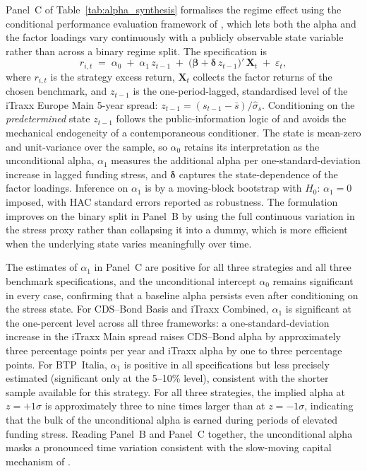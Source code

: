 Panel~C of Table~\ref{tab:alpha_synthesis} formalises the regime effect
using the conditional performance evaluation framework of
\citet{christopherson1998conditioning}, which lets both the alpha and the
factor loadings vary continuously with a publicly observable state variable
rather than across a binary regime split. The specification is
\begin{equation}\label{eq:cfg}
  r_{i,t} \;=\; \alpha_0 \;+\; \alpha_1\, z_{t-1}
  \;+\; \bigl(\boldsymbol{\beta} + \boldsymbol{\delta}\, z_{t-1}\bigr)'\,
  \mathbf{X}_{t} \;+\; \varepsilon_{t},
\end{equation}
where $r_{i,t}$ is the strategy excess return, $\mathbf{X}_t$ collects the factor
returns of the chosen benchmark, and $z_{t-1}$ is the one-period-lagged,
standardised level of the iTraxx Europe Main 5-year spread:
$z_{t-1} = (s_{t-1} - \bar{s})/\hat{\sigma}_s$. Conditioning on the
\emph{predetermined} state $z_{t-1}$ follows the public-information logic of
\citet{christopherson1998conditioning} and avoids the mechanical endogeneity of
a contemporaneous conditioner. The state is mean-zero and unit-variance over the
sample, so $\alpha_0$ retains its interpretation as the unconditional alpha,
$\alpha_1$ measures the additional alpha per one-standard-deviation increase in
lagged funding stress, and $\boldsymbol{\delta}$ captures the state-dependence of
the factor loadings. Inference on $\alpha_1$ is by a moving-block bootstrap with
$H_0{:}\,\alpha_1=0$ imposed, with \citet{newey1994automatic} HAC standard errors
reported as robustness. 
The \citet{christopherson1998conditioning} formulation improves on the binary
split in Panel~B by using the full continuous variation in the stress
proxy rather than collapsing it into a dummy, which is more efficient
when the underlying state varies meaningfully over time.

The estimates of $\alpha_1$ in Panel~C are positive for all three
strategies and all three benchmark specifications, and the
unconditional intercept $\alpha_0$ remains significant in every case,
confirming that a baseline alpha persists even after conditioning on
the stress state. For CDS--Bond Basis and iTraxx Combined, $\alpha_1$
is significant at the one-percent level across all three frameworks: a
one-standard-deviation increase in the iTraxx Main spread raises
CDS--Bond alpha by approximately three percentage points per year and
iTraxx alpha by one to three percentage points. For BTP~Italia, $\alpha_1$ is positive in all specifications but
less precisely estimated (significant only at the 5--10\% level),
consistent with the shorter sample available for this strategy. For all three strategies, the implied alpha at
$z = +1\sigma$ is approximately three to nine times larger than at
$z = -1\sigma$, indicating that the bulk of the unconditional alpha
is earned during periods of elevated funding stress. Reading Panel~B and Panel~C
together, the unconditional alpha masks a pronounced time variation
consistent with the slow-moving capital mechanism of
\citet{duffie2010presidential}.

